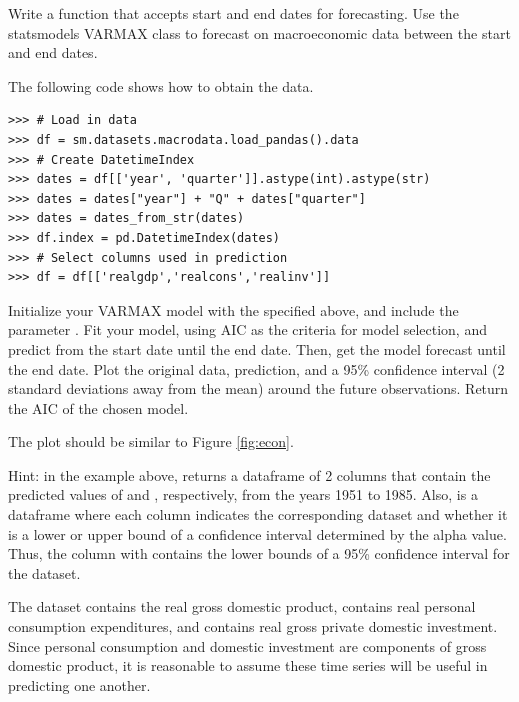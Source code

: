 \begin{problem}
\label{prob:arma:smvarma}

Write a function  that accepts start and end dates for forecasting.
Use the statsmodels VARMAX class to forecast on macroeconomic data between the start and end dates.

The following code shows how to obtain the data.

\begin{lstlisting}
>>> # Load in data
>>> df = sm.datasets.macrodata.load_pandas().data
>>> # Create DatetimeIndex
>>> dates = df[['year', 'quarter']].astype(int).astype(str)
>>> dates = dates["year"] + "Q" + dates["quarter"]
>>> dates = dates_from_str(dates)
>>> df.index = pd.DatetimeIndex(dates)
>>> # Select columns used in prediction
>>> df = df[['realgdp','realcons','realinv']]
\end{lstlisting}

Initialize your VARMAX model with the  specified above, and include the parameter .
Fit your model, using AIC as the criteria for model selection, and predict from the start date until the end date.
Then, get the model forecast until the end date.
Plot the original data, prediction, and a 95\% confidence interval (2 standard deviations away from the mean) around the future observations.
Return the AIC of the chosen model.

The plot should be similar to Figure \ref{fig:econ}.

\noindent Hint: in the example above,  returns a dataframe of 2 columns that contain the predicted values of  and , respectively, from the years 1951 to 1985.
Also,  is a dataframe where each column indicates the corresponding dataset and whether it is a lower or upper bound of a confidence interval determined by the alpha value.
Thus, the column  with  contains the lower bounds of a 95\% confidence interval for the  dataset.

The dataset  contains the real gross domestic product,  contains real personal consumption expenditures, and  contains real gross private domestic investment.
Since personal consumption and domestic investment are components of gross domestic product, it is reasonable to assume these time series will be useful in predicting one another.

\end{problem}

